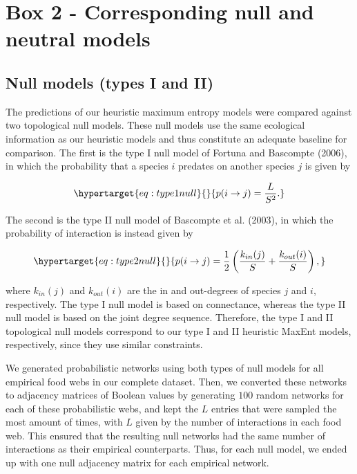 \documentclass[11pt]{article}
\begin{document}
\hypertarget{box-2---corresponding-null-and-neutral-models}{%
\section{Box 2 - Corresponding null and neutral
models}\label{box-2---corresponding-null-and-neutral-models}}

\hypertarget{null-models-types-i-and-ii}{%
\subsection{Null models (types I and
II)}\label{null-models-types-i-and-ii}}

The predictions of our heuristic maximum entropy models were compared
against two topological null models. These null models use the same
ecological information as our heuristic models and thus constitute an
adequate baseline for comparison. The first is the type I null model of
Fortuna and Bascompte (2006), in which the probability that a species
\(i\) predates on another species \(j\) is given by

\begin{equation}\protect\hypertarget{eq:type1null}{}{p(i \rightarrow j) = \frac{L}{S^2}.}\label{eq:type1null}\end{equation}

The second is the type II null model of Bascompte et al. (2003), in
which the probability of interaction is instead given by

\begin{equation}\protect\hypertarget{eq:type2null}{}{p(i \rightarrow j) = \frac{1}{2} \left(\frac{k_{in}(j)}{S} + \frac{k_{out}(i)}{S}\right),}\label{eq:type2null}\end{equation}

where \(k_{in}(j)\) and \(k_{out}(i)\) are the in and out-degrees of
species \(j\) and \(i\), respectively. The type I null model is based on
connectance, whereas the type II null model is based on the joint degree
sequence. Therefore, the type I and II topological null models
correspond to our type I and II heuristic MaxEnt models, respectively,
since they use similar constraints.

We generated probabilistic networks using both types of null models for
all empirical food webs in our complete dataset. Then, we converted
these networks to adjacency matrices of Boolean values by generating
\(100\) random networks for each of these probabilistic webs, and kept
the \(L\) entries that were sampled the most amount of times, with \(L\)
given by the number of interactions in each food web. This ensured that
the resulting null networks had the same number of interactions as their
empirical counterparts. Thus, for each null model, we ended up with one
null adjacency matrix for each empirical network.
\end{document}
